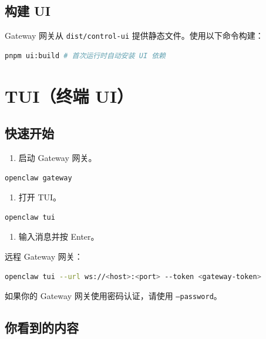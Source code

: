 \subsection{构建 UI}


Gateway 网关从 \texttt{dist/control-ui} 提供静态文件。使用以下命令构建：

\begin{lstlisting}[language=bash]
pnpm ui:build # 首次运行时自动安装 UI 依赖
\end{lstlisting}



\clearpage

\section{TUI（终端 UI）}


\subsection{快速开始}


\begin{enumerate}
  \item 启动 Gateway 网关。
\end{enumerate}


\begin{lstlisting}[language=bash]
openclaw gateway
\end{lstlisting}


\begin{enumerate}
  \item 打开 TUI。
\end{enumerate}


\begin{lstlisting}[language=bash]
openclaw tui
\end{lstlisting}


\begin{enumerate}
  \item 输入消息并按 Enter。
\end{enumerate}


远程 Gateway 网关：

\begin{lstlisting}[language=bash]
openclaw tui --url ws://<host>:<port> --token <gateway-token>
\end{lstlisting}


如果你的 Gateway 网关使用密码认证，请使用 \texttt{--password}。

\subsection{你看到的内容}


